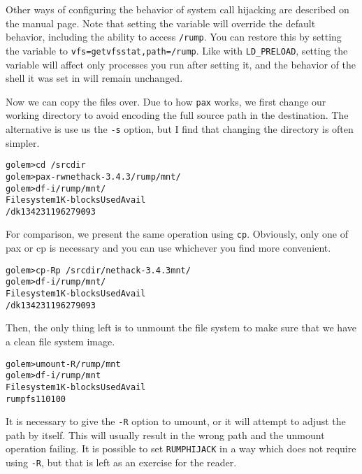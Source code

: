 Other ways of configuring the behavior of system call hijacking
are described on the manual page.
Note that setting the variable will override the default behavior,
including the ability to access \verb+/rump+.  You
can restore this by setting the variable to
\verb+vfs=getvfsstat,path=/rump+.
Like with \verb+LD_PRELOAD+, setting the variable will
affect only processes you run after setting it, and the behavior
of the shell it was set in will remain unchanged.

Now we can copy the files over.  Due to how \verb+pax+
works, we first change our working directory to avoid encoding the
full source path in the destination.  The alternative is use us the
\verb+-s+ option, but I find that changing the directory is often
simpler.

{\footnotesize
\begin{alltt}
golem> cd ~/srcdir
golem> pax -rw nethack-3.4.3 /rump/mnt/
golem> df -i /rump/mnt/
Filesystem   1K-blocks       Used      Avail %Cap    iUsed   iAvail %iCap Mounted on
/dk              13423      11962        790  93%      695     6087   10% /mnt
\end{alltt}}

For comparison, we present the same operation using \verb+cp+.
Obviously, only one of pax or cp is necessary and you can use
whichever you find more convenient.

{\footnotesize
\begin{alltt}
golem> cp -Rp ~/srcdir/nethack-3.4.3 mnt/
golem> df -i /rump/mnt/
Filesystem   1K-blocks       Used      Avail %Cap    iUsed   iAvail %iCap Mounted on
/dk              13423      11962        790  93%      695     6087   10% /mnt
\end{alltt}}

Then, the only thing left is to unmount the file system to make
sure that we have a clean file system image.

{\footnotesize
\begin{alltt}
golem> umount -R /rump/mnt
golem> df -i /rump/mnt
Filesystem   1K-blocks       Used      Avail %Cap    iUsed   iAvail %iCap Mounted on
rumpfs               1          1          0 100%        0        0    0% /
\end{alltt}}

It is necessary to give the \verb+-R+ option to umount,
or it will attempt to adjust the path by itself.  This will usually
result in the wrong path and the unmount operation failing.
It is possible to set \verb+RUMPHIJACK+ in a way which does
not require using \verb+-R+, but that is left as an
exercise for the reader.

